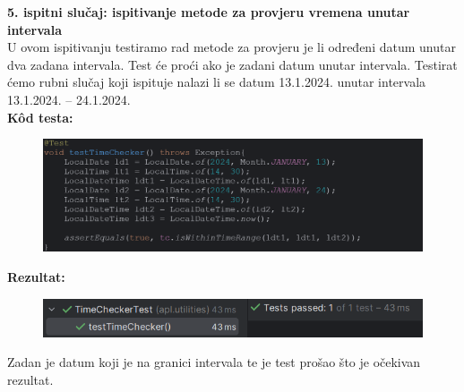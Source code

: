 \noindent \textbf{5. ispitni slučaj: ispitivanje metode za provjeru vremena unutar intervala}\\
U ovom ispitivanju testiramo rad metode za provjeru je li određeni datum unutar dva zadana intervala. Test će proći ako je zadani datum unutar intervala. Testirat ćemo rubni slučaj koji ispituje nalazi li se datum 13.1.2024. unutar intervala 13.1.2024. – 24.1.2024. \\
\textbf{Kôd testa:}
\begin{figure}[H]
	\includegraphics[scale=0.5]{slike/kodTesta5.PNG} %
	\centering
\end{figure}
\noindent \textbf{Rezultat:}
\begin{figure}[H]
	\includegraphics[scale=0.6]{slike/test5.PNG} %
	\centering
\end{figure}
\noindent Zadan je datum koji je na granici intervala te je test prošao što je očekivan rezultat. \\

